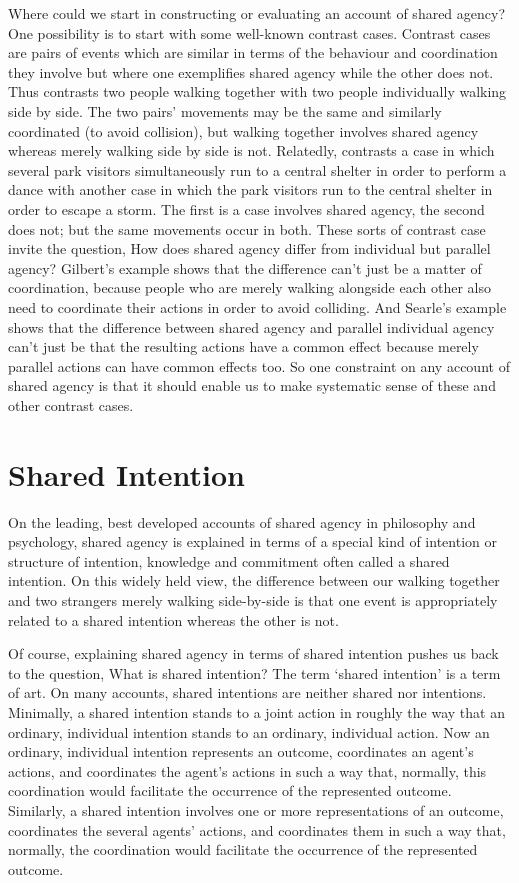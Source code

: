 \documentclass[12pt,\papersize]{extarticle}
\begin{document}
Where could we start in constructing or evaluating an account of shared agency?
One possibility is to start with some well-known contrast cases.
Contrast cases are pairs of events which are similar in terms of the behaviour and coordination they involve but where one exemplifies shared agency  while the other does not.  
Thus \citet{gilbert_walking_1990} contrasts two people walking together with two people individually walking side by side.  
The two pairs' movements may be the same and similarly coordinated (to avoid collision), but walking together involves shared agency whereas merely walking side by side is not. 
Relatedly,  \citet{Searle:1990em}  contrasts a case in which several park visitors simultaneously run to a central shelter in order to perform a dance with another case in which the park visitors run to the central shelter in order to escape a storm.  The first is a case involves shared agency, the second does not; but the same movements occur in both.  
These sorts of contrast case invite the question, 
How does shared agency differ from individual but parallel agency? 
Gilbert’s example shows that the difference can’t just be a matter of coordination, because people who are merely walking alongside each other also need to coordinate their actions in order to avoid colliding.  
And Searle’s example shows that the difference between shared agency and parallel individual agency can’t just be that the resulting actions have a common effect because merely parallel actions can have common effects too. 
So one constraint on any account of shared agency is that it should enable us to make systematic sense of these and other contrast cases.

\section{Shared Intention}
On the leading, best developed accounts of shared agency in philosophy and psychology, 
shared agency is explained  in terms of a special kind of intention or structure of intention, knowledge and commitment often called a shared intention.
On this widely held view, the difference between our walking together and two strangers merely walking side-by-side is that one event is appropriately related to a shared intention whereas the other is not.

Of course, explaining shared agency in terms of shared intention pushes us back to the question, What is shared intention?
The term `shared intention' is a term of art.
On many accounts, shared intentions are neither shared nor intentions.
Minimally, a shared intention stands to a joint action in roughly the way that an ordinary, individual intention stands to an ordinary, individual action.
Now an ordinary, individual intention represents an outcome, coordinates an agent's actions, and coordinates the agent's actions in such a way that, normally, this coordination would facilitate the occurrence of the represented outcome.
Similarly, a shared intention involves one or more representations of an outcome, coordinates the several agents' actions, and coordinates them in such a way that, normally, the coordination would facilitate the occurrence of the represented outcome.
\end{document}
